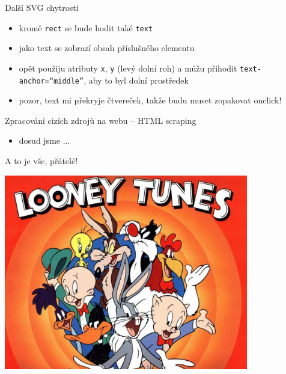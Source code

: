 \documentclass{beamer}
\begin{document}
\begin{frame}{Další SVG chytrosti}
  \begin{itemize}
    \item kromě \texttt{rect} se bude hodit také \texttt{text}
    \item jako text se zobrazí obsah příslušného elementu
    \item opět použiju atributy \texttt{x}, \texttt{y} (levý dolní roh) a můžu přihodit \texttt{text-anchor=``middle''}, aby to byl dolní prostředek
    \item pozor, text mi překryje čtvereček, takže budu muset zopakovat onclick!
  \end{itemize}
\end{frame}

\begin{frame}{Zpracování cizích zdrojů na webu -- HTML scraping}
  \begin{itemize}
    \item dosud jsme ...
  \end{itemize}
\end{frame}


\begin{frame}{A to je vše, přátelé!}
  \begin{center}
    \includegraphics[width=0.8\textwidth]{looney_tunes}
  \end{center}
\end{frame}
\end{document}
